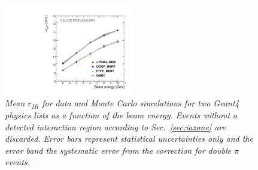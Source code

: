 \begin{figure}
	\centering
	\includegraphics[width=0.5\textwidth]{ECAL/plots/r-ir-graph.pdf}
	\caption{\label{fig:irrgraphF} \sl Mean $r_{IR}$ for data and Monte Carlo simulations for two {\sc Geant}4 physics lists as a function of the beam energy. Events without a detected interaction region according to Sec.~\ref{sec:iazone} are discarded. Error bars represent statistical uncertainties only and the error band the systematic error from the correction for double $\pi$ events.}
\end{figure}

